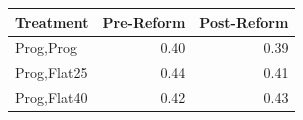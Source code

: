 \begin{tabular}{lrr}
\toprule
Treatment & Pre-Reform & Post-Reform \\
\midrule
Prog,Prog & 0.40 & 0.39 \\
Prog,Flat25 & 0.44 & 0.41 \\
Prog,Flat40 & 0.42 & 0.43 \\
\bottomrule
\end{tabular}
